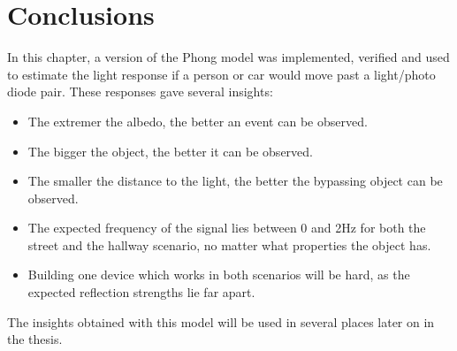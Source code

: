 \section{Conclusions}
In this chapter, a version of the Phong model was implemented, verified and used to estimate the light response if a person or car would move past a light/photo diode pair. These responses gave several insights:
\begin{itemize}[itemsep=-1ex,topsep=0pt]
	\item The extremer the albedo, the better an event can be observed.
	\item The bigger the object, the better it can be observed.
	\item The smaller the distance to the light, the better the bypassing object can be observed.
	\item The expected frequency of the signal lies between 0 and 2Hz for both the street and the hallway scenario, no matter what properties the object has.
	\item Building one device which works in both scenarios will be hard, as the expected reflection strengths lie far apart.

\end{itemize}
The insights obtained with this model will be used in several places later on in the thesis.